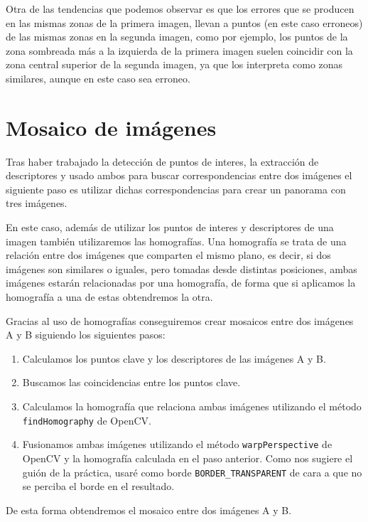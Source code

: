 \documentclass[12pt, spanish]{article}
\begin{document}
Otra de las tendencias que podemos observar es que los errores que se producen en las mismas zonas de la primera imagen, llevan a puntos (en este caso erroneos) de las mismas zonas en la segunda imagen, como por ejemplo, los puntos de la zona sombreada más a la izquierda de la primera imagen suelen coincidir con la zona central superior de la segunda imagen, ya que los interpreta como zonas similares, aunque en este caso sea erroneo.


\newpage

\section{Mosaico de imágenes}

Tras haber trabajado la detección de puntos de interes, la extracción de descriptores y usado ambos para buscar correspondencias entre dos imágenes el siguiente paso es utilizar dichas correspondencias para crear un panorama con tres imágenes.

En este caso, además de utilizar los puntos de interes y descriptores de una imagen también utilizaremos las homografías. Una homografía se trata de una relación entre dos imágenes que comparten el mismo plano, es decir, si dos imágenes son similares o iguales, pero tomadas desde distintas posiciones, ambas imágenes estarán relacionadas por una homografía, de forma que si aplicamos la homografía a una de estas obtendremos la otra.

Gracias al uso de homografías conseguiremos crear mosaicos entre dos imágenes A y B siguiendo los siguientes pasos:

\begin{enumerate}
	\item Calculamos los puntos clave y los descriptores de las imágenes A y B.
	\item Buscamos las coincidencias entre los puntos clave.
	\item Calculamos la homografía que relaciona ambas imágenes utilizando el método \texttt{findHomography} de OpenCV.
	\item Fusionamos ambas imágenes utilizando el método \texttt{warpPerspective} de OpenCV y la homografía calculada en el paso anterior. Como nos sugiere el guión de la práctica, usaré como borde \texttt{BORDER\_TRANSPARENT} de cara a que no se perciba el borde en el resultado.
\end{enumerate}

De esta forma obtendremos el mosaico entre dos imágenes A y B.
\end{document}
